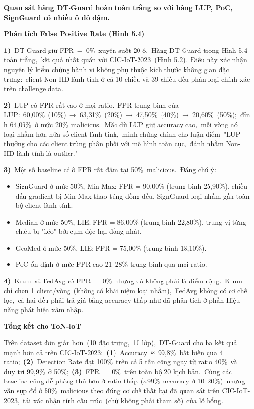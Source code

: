 \textbf{Quan sát hàng DT-Guard hoàn toàn trắng so với hàng LUP, PoC, SignGuard có nhiều ô đỏ đậm.}

\textbf{Phân tích False Positive Rate (Hình 5.4)}

\textbf{1)}~DT-Guard giữ FPR~=~0\%~xuyên suốt 20 ô.~Hàng DT-Guard trong Hình 5.4 toàn trắng,~kết quả nhất quán với CIC-IoT-2023~(Hình 5.2).~Điều này xác nhận nguyên lý kiểm chứng hành vi không phụ thuộc kích thước không gian đặc trưng:~client Non-IID lành tính ở cả 10 chiều và 39 chiều đều phân loại chính xác trên challenge data.

\textbf{2)}~LUP có FPR rất cao ở mọi ratio.~FPR trung bình của LUP:~60,00\%~(10\%)~→~63,31\%~(20\%)~→~47,50\%~(40\%)~→~20,60\%~(50\%);~đỉnh 64,06\%~ở mức 20\%~malicious.~Mặc dù LUP giữ accuracy cao,~mỗi vòng nó loại nhầm hơn nửa số client lành tính,~minh chứng chính cho luận điểm~"LUP thưởng cho các client trùng phân phối với mô hình toàn cục,~đánh nhầm Non-IID lành tính là outlier."

\textbf{3)}~Một số baseline có ô FPR rất đậm tại 50\%~malicious.~Đáng chú ý:

\begin{itemize}
\item
  SignGuard ở mức 50\%, Min-Max: FPR = 90,00\% (trung bình 25,90\%), chiều dấu gradient bị Min-Max thao túng đồng đều, SignGuard loại nhầm gần toàn bộ client lành tính.
\item
  Median ở mức 50\%, LIE: FPR = 86,00\% (trung bình 22,80\%), trung vị từng chiều bị "kéo" bởi cụm độc hại đồng nhất.
\item
  GeoMed ở mức 50\%, LIE: FPR = 75,00\% (trung bình 18,10\%).
\item
  PoC ổn định ở mức FPR cao 21--28\% trung bình qua mọi ratio.
\end{itemize}

\textbf{4)}~Krum và FedAvg có FPR~=~0\%~nhưng đó không phải là điểm cộng.~Krum chỉ chọn 1 client/vòng~(không có khái niệm loại nhầm),~FedAvg không có cơ chế lọc,~cả hai đều phải trả giá bằng accuracy thấp như đã phân tích ở phần Hiệu năng phát hiện xâm nhập.

\textbf{Tổng kết cho ToN-IoT}

Trên dataset đơn giản hơn~(10 đặc trưng,~10 lớp),~DT-Guard cho ba kết quả mạnh hơn cả trên CIC-IoT-2023:~\textbf{(1)}~Accuracy~≈~99,8\%~bất biến qua 4 ratio;~\textbf{(2)}~Detection Rate đạt 100\%~trên cả 5 tấn công ngay từ ratio 40\%~và duy trì 99,9\%~ở 50\%;~\textbf{(3)}~FPR~=~0\%~trên toàn bộ 20 kịch bản.~Cùng các baseline cũng dễ phòng thủ hơn ở ratio thấp~(\textasciitilde99\%~accuracy ở 10--20\%)~nhưng vẫn sụp đổ ở 50\%~malicious theo đúng cơ chế thất bại đã quan sát trên CIC-IoT-2023,~tái xác nhận tính cấu trúc~(chứ không phải tham số)~của lỗ hổng.

